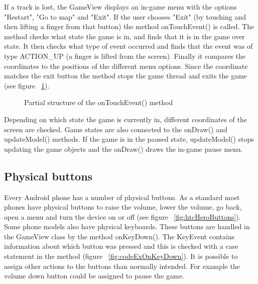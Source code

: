 If a track is lost, the GameView displays an in-game menu with the options "Restart", "Go to map" and "Exit". If the user chooses "Exit" (by touching and then lifting a finger from that button) the method onTouchEvent() is called. The method checks what state the game is in, and finds that it is in the game over state. It then checks what type of event occurred and finds that the event was of type ACTION\_UP (a finger is lifted from the screen). Finally it compares the coordinates to the positions of the different menu options. Since the coordinate matches the exit button the method stops the game thread and exits the game (see figure ~\ref{fig:codeExIngameExitButton}).

\begin{figure}[htb]
\begin{small}

\end{small}
\caption{Partial structure of the onTouchEvent() method}
\label{fig:codeExIngameExitButton}
\end{figure}

Depending on which state the game is currently in, different coordinates of the screen are checked. Game states are also connected to the onDraw() and updateModel() methods. If the game is in the paused state, updateModel() stops updating the game objects and the onDraw() draws the in-game pause menu.

\subsection{Physical buttons}

Every Android phone has a number of physical buttons. As a standard most phones have physical buttons to raise the volume, lower the volume, go back, open a menu and turn the device on or off (see figure ~\ref{fig:htcHeroButtons}). Some phone models also have physical keyboards. These buttons are handled in the GameView class by the method onKeyDown(). The KeyEvent contains information about which button was pressed and this is checked with a case statement in the method (figure ~\ref{fig:codeExOnKeyDown}). It is possible to assign other actions to the buttons than normally intended. For example the volume down button could be assigned to pause the game.

